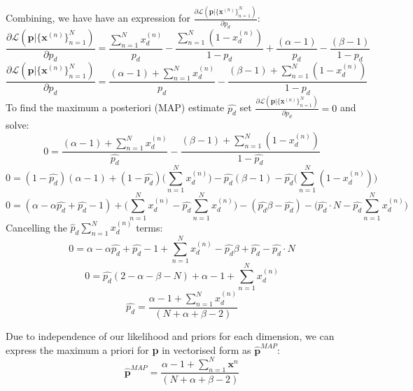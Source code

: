 \documentclass[12pt]{article}
\begin{document}
\begin{enumerate}
Combining, we have have an expression for $\frac{\partial\mathcal{L}(\textbf{p}|\{\textbf{x}^{(n)}\}_{n=1}^N)}{\partial p_d}$:
$$\frac{\partial\mathcal{L}(\textbf{p}|\{\textbf{x}^{(n)}\}_{n=1}^N)}{\partial p_d} = \frac{\sum_{n=1}^{N} x_d^{(n)}}{p_d} -  \frac{\sum_{n=1}^{N} (1-x_d^{(n)})}{1-p_d} + \frac{(\alpha-1)}{p_d} -  \frac{(\beta-1)}{1-p_d}$$
$$\frac{\partial\mathcal{L}(\textbf{p}|\{\textbf{x}^{(n)}\}_{n=1}^N)}{\partial p_d} = \frac{(\alpha-1) + \sum_{n=1}^{N} x_d^{(n)}}{p_d} -  \frac{(\beta-1) + \sum_{n=1}^{N} (1-x_d^{(n)})}{1-p_d}$$
To find the maximum a posteriori (MAP) estimate $\hat{p_d}$ set $\frac{\partial\mathcal{L}(\textbf{p}|\{\textbf{x}^{(n)}\}_{n=1}^N)}{\partial p_d} = 0$ and solve:
$$0 = \frac{(\alpha-1) + \sum_{n=1}^{N} x_d^{(n)}}{\hat{p_d}} -  \frac{(\beta-1) + \sum_{n=1}^{N} (1-x_d^{(n)})}{1-\hat{p_d}}$$
$$0 = (1-\hat{p_d})(\alpha-1) + (1-\hat{p_d})\bigg(\sum_{n=1}^{N} x_d^{(n)}\bigg) -  \hat{p_d}(\beta-1) - \hat{p_d}\bigg(\sum_{n=1}^{N} (1-x_d^{(n)})\bigg)$$
$$0 = (\alpha-\alpha \hat{p_d} + \hat{p_d} - 1) +\bigg(\sum_{n=1}^{N} x_d^{(n)} - \hat{p_d} \sum_{n=1}^{N} x_d^{(n)}\bigg) -  (\hat{p_d}\beta-\hat {p_d}) - \bigg(\hat{p_d}\cdot N - \hat{p_d}\sum_{n=1}^{N}x_d^{(n)}\bigg)$$
Cancelling the $\hat p_d\sum_{n=1}^{N} x_d^{(n)}$ terms:
$$0 = \alpha-\alpha \hat{p_d} + \hat{p_d} - 1 +\sum_{n=1}^{N} x_d^{(n)} -  \hat{p_d}\beta+\hat{p_d} - \hat{p_d}\cdot N$$
$$0 = \hat{p_d}(2-\alpha-\beta-N) + \alpha - 1 +\sum_{n=1}^{N} x_d^{(n)}$$
$$\hat{p_d} =  \frac{\alpha - 1 +\sum_{n=1}^{N} x_d^{(n)}}{(N+\alpha+\beta-2)}$$

Due to independence of our likelihood and priors for each dimension, we can express the maximum a priori for \textbf{p} in vectorised form as $\hat{\textbf{p}}^{MAP}$:
$$\hat{\textbf{p}}^{MAP} =   \frac{\alpha - 1 +\sum_{n=1}^{N} \textbf{x}^n}{(N+\alpha+\beta-2)}$$



\end{enumerate}
\end{document}
